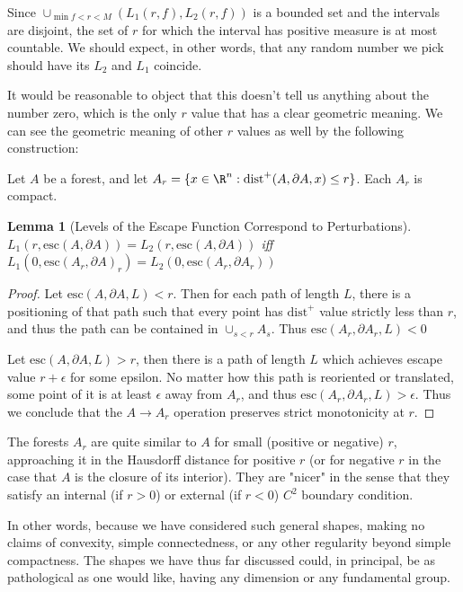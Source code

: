 \documentclass{journal}
\newtheorem{lem}[thm]{Lemma}          %
\theoremstyle{definition}
\begin{document}
Since $\cup_{\min f<r<M}  (L_1(r,f),L_2(r,f)) $ is a bounded set and the intervals are disjoint, the set of $r$ for which the interval has positive measure is at most countable. We should expect, in other words, that any random number we pick should have its $L_2$ and $L_1$ coincide.

It would be reasonable to object that this doesn't tell us anything about the number zero, which is the only $r$ value that has a clear geometric meaning. We can see the geometric meaning of other $r$ values as well by the following construction:

Let $A$ be a forest, and let $A_r = \{x\in\R^n: \mathrm{dist}^+(A,\partial A, x) \leq r\}$. Each $A_r$ is compact. 
\begin{lem}[Levels of the Escape Function Correspond to Perturbations]
$L_1(r,\mathrm{esc}(A,\partial A)) = L_2(r,\mathrm{esc}(A,\partial A))$ iff $L_1(0,\mathrm{esc}(A_r,\partial A)_r) = L_2(0,\mathrm{esc}(A_r,\partial A_r))$
\end{lem}
\label{lem:levels}

\begin{proof}
Let $\mathrm{esc}(A,\partial A, L) < r$. Then for each path of length $L$, there is a positioning of that path such that every point has $\mathrm{dist}^+$ value strictly less than $r$, and thus the path can be contained in $\cup_{s<r}A_s$. Thus $\mathrm{esc}(A_r,\partial A_r, L) < 0$

Let $\mathrm{esc}(A,\partial A, L) > r$, then there is a path of length $L$ which achieves escape value $r+\epsilon$ for some epsilon. No matter how this path is reoriented or translated, some point of it is at least $\epsilon$ away from $A_r$, and thus $\mathrm{esc}(A_r,\partial A_r, L) > \epsilon$. Thus we conclude that the $A\rightarrow A_r$ operation preserves strict monotonicity at $r$. 
\end{proof}

The forests $A_r$ are quite similar to $A$ for small (positive or negative) $r$, approaching it in the Hausdorff distance for positive $r$ (or for negative $r$ in the case that $A$ is the closure of its interior). They are "nicer" in the sense that they satisfy an internal (if $r>0$) or external (if $r<0$) $C^2$ boundary condition.

In other words, because we have considered such general shapes, making no claims of convexity, simple connectedness, or any other regularity beyond simple compactness. The shapes we have thus far discussed could, in principal, be as pathological as one would like, having any dimension or any fundamental group. 
\end{document}
